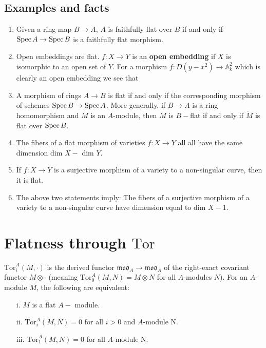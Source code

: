 \documentclass[12pt]{article}
\theoremstyle{mytheoremstyle}
\newcommand{\bA}{\mathbb{A}}
\newcommand{\spec}{\text{Spec\hspace*{.5mm}}}
\newcommand{\tor}{\text{Tor}}
\begin{document}
\subsection*{Examples and facts}
\begin{enumerate}
    \item Given a ring map $B\to A$, $A$ is faithfully flat over $B$
        if and only if $\spec A\to\spec B$ is a faithfully flat morphism.
    \item Open embeddings are flat. $f:X\to Y$ is an \textbf{open
        embedding} if $X$ is isomorphic to an open set of $Y$. For a
        morphism $f:D(y-x^2)\to \bA^2_k$ which is clearly an open
        embedding we see that 
    \item A morphism of rings $A\to B$ is flat if and only if the
        corresponding morphism of schemes $\spec B\to\spec A$.
        More generally, if $B\to A$ is a ring homomorphism and $M$ is
        an $A$-module, then $M$ is $B-$flat if and only if
        $\widetilde{M}$ is flat over $\spec B$.
    \item The fibers of a flat morphism of varieties $f:X\to Y$ all
        all have the same dimension dim $X-$ dim $Y$. 
    \item If $f:X\to Y$ is a surjective morphism of a variety to
        a non-singular curve, then it is flat.
    \item The above two statements imply: The fibers of a surjective
        morphism of a variety to a non-singular curve have dimension
        equal to dim $X-1$.
\end{enumerate}

\section{Flatness through $\tor$}
\hspace*{8mm}$\tor^A_i(M,\cdot)$ is the derived functor
$\mathfrak{mod}_A\to\mathfrak{mod}_A$
of the right-exact covariant functor
$M\otimes\cdot$ (meaning $\tor^A_0(M,N)
=M\otimes N$ for all $A$-modules $N$).
For an $A$-module $M$, the following are equivalent:
\begin{enumerate}
    \item[i.] $M$ is a flat $A-$ module.
    \item[ii.] $\tor^A_i(M,N)=0$ for all $i>0$ and $A$-module N.
    \item[iii.] $\tor^A_1(M,N)=0$ for all $A$-module N.
\end{enumerate}
\end{document}
